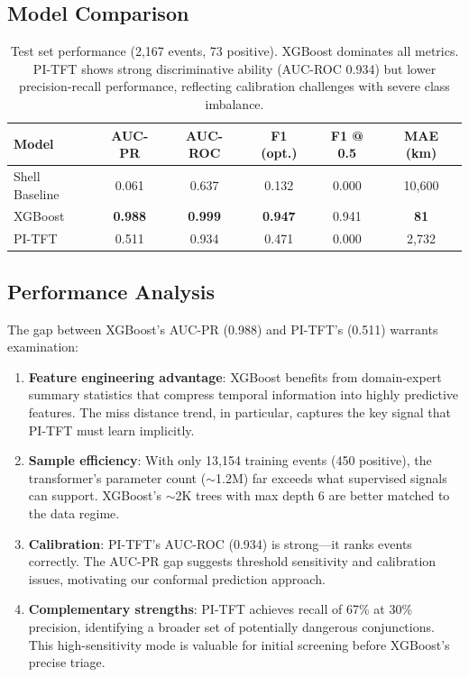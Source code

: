 \documentclass{article}
\begin{document}
\subsection{Model Comparison}
\label{sec:comparison}

\begin{table}[h]
\centering
\caption{Test set performance (2,167 events, 73 positive). XGBoost dominates all metrics. PI-TFT shows strong discriminative ability (AUC-ROC 0.934) but lower precision-recall performance, reflecting calibration challenges with severe class imbalance.}
\label{tab:model-comparison}
\begin{tabular}{@{}lccccc@{}}
\toprule
Model & AUC-PR & AUC-ROC & F1 (opt.) & F1 @ 0.5 & MAE (km) \\
\midrule
Shell Baseline & 0.061 & 0.637 & 0.132 & 0.000 & 10,600 \\
XGBoost & \textbf{0.988} & \textbf{0.999} & \textbf{0.947} & 0.941 & \textbf{81} \\
PI-TFT & 0.511 & 0.934 & 0.471 & 0.000 & 2,732 \\
\bottomrule
\end{tabular}
\end{table}

\subsection{Performance Analysis}
\label{sec:perf-analysis}

The gap between XGBoost's AUC-PR (0.988) and PI-TFT's (0.511) warrants examination:

\begin{enumerate}
\item \textbf{Feature engineering advantage}: XGBoost benefits from domain-expert summary statistics that compress temporal information into highly predictive features. The miss distance trend, in particular, captures the key signal that PI-TFT must learn implicitly.

\item \textbf{Sample efficiency}: With only 13,154 training events (450 positive), the transformer's parameter count ($\sim$1.2M) far exceeds what supervised signals can support. XGBoost's $\sim$2K trees with max depth 6 are better matched to the data regime.

\item \textbf{Calibration}: PI-TFT's AUC-ROC (0.934) is strong---it ranks events correctly. The AUC-PR gap suggests threshold sensitivity and calibration issues, motivating our conformal prediction approach.

\item \textbf{Complementary strengths}: PI-TFT achieves recall of 67\% at 30\% precision, identifying a broader set of potentially dangerous conjunctions. This high-sensitivity mode is valuable for initial screening before XGBoost's precise triage.
\end{enumerate}
\end{document}
